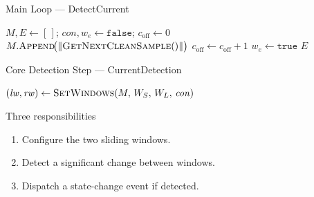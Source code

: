 \documentclass{beamer}
\begin{document}
\begin{frame}{Main Loop --- DetectCurrent}
    \small
  \begin{algorithmic}[1]
      \State $M,E \gets [\,]$;\;
             $\mathit{con},w_e \gets \texttt{false}$;\;
             $c_\text{off} \gets 0$
          \hfill{}
        \State $M.\textsc{Append}\!\bigl(\|\textsc{GetNextCleanSample}()\|\bigr)$
          \hfill{}
            \State $c_\text{off} \gets c_\text{off} + 1$
          \EndIf
            \State $w_e \gets \texttt{true}$
            \hfill{}
          \EndIf
          \State {}
        \EndIf
      \EndWhile
      \State \Return $E$
    \EndFunction
  \end{algorithmic}
\end{frame}


\begin{frame}{Core Detection Step --- CurrentDetection}
  \begin{algorithmic}[1]
      \State $(\mathit{lw},\mathit{rw}) \gets \Call{SetWindows}{M,\, W_S,\, W_L,\, \mathit{con}}$
      \hfill{}
        \State {}
      \EndIf
    \EndFunction
  \end{algorithmic}
  \vspace{1em}
  \begin{block}{Three responsibilities}
    \begin{enumerate}
      \item Configure the two sliding windows.
      \item Detect a significant change between windows.
      \item Dispatch a state-change event if detected.
    \end{enumerate}
  \end{block}
\end{frame}
\end{document}
